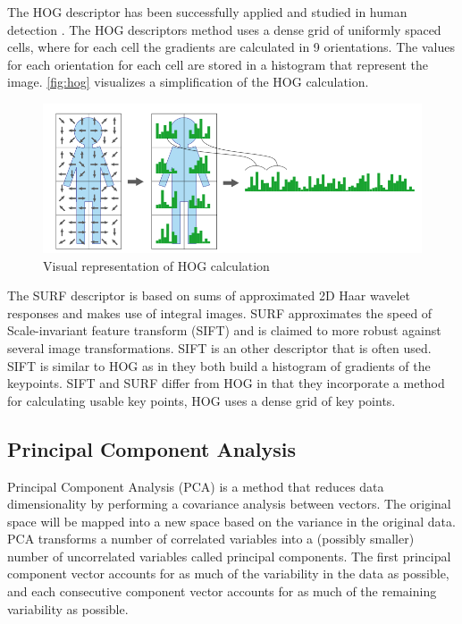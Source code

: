 The HOG descriptor has been successfully applied and studied in human detection \citep{NavneetDalal2006, watanabe2009}. The HOG descriptors method uses a dense grid of uniformly spaced cells, where for each cell the gradients are calculated in 9 orientations. The values for each orientation for each cell are stored in a histogram that represent the image. \autoref{fig:hog} visualizes a simplification of the HOG calculation. 

\begin{figure}[htbp]
\center{}
\includegraphics[width=0.8\linewidth]{figures/hog.png}
\caption{Visual representation of HOG calculation}
\label{fig:hog}
\end{figure}


The SURF descriptor is based on sums of approximated 2D Haar wavelet responses and makes use of integral images. SURF approximates the speed of Scale-invariant feature transform (SIFT) and is claimed to more robust against several image transformations\citep{Murillo2007, Valgren2010}. SIFT is an other descriptor that is often used. SIFT is similar to HOG as in they both build a histogram of gradients of the keypoints. SIFT and SURF differ from HOG in that they incorporate a method for calculating usable key points, HOG uses a dense grid of key points.



\subsection{Principal Component Analysis}
Principal Component Analysis (PCA) is a method that reduces data dimensionality by performing a covariance analysis between vectors. The original space will be mapped into a new space based on the variance in the original data. PCA transforms a number of correlated variables into a (possibly smaller) number of uncorrelated variables called principal components. The first principal component vector accounts for as much of the variability in the data as possible, and each consecutive component vector accounts for as much of the remaining variability as possible. 

